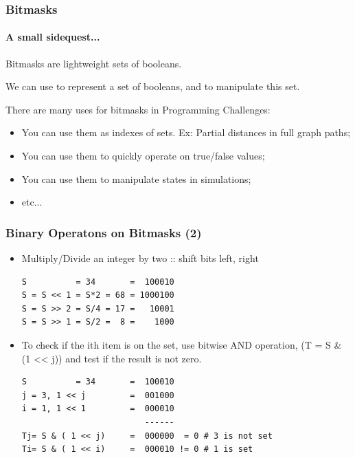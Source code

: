 \documentclass{beamer}
\begin{document}

\begin{frame}
  \frametitle{Bitmasks}
  \framesubtitle{A small sidequest...}

  Bitmasks are lightweight sets of booleans.

  \bigskip

  We can use  to represent a set
  of booleans, and  to manipulate this set.

  \bigskip

  There are many uses for bitmasks in Programming Challenges:
  
  \begin{itemize}
  \item You can use them as indexes of sets. Ex: Partial distances in full graph
    paths;
  \item You can use them to quickly operate on true/false values;
  \item You can use them to manipulate states in simulations;
  \item etc...
  \end{itemize}
\end{frame}

\begin{frame}[fragile]
  \frametitle{Binary Operatons on Bitmasks (2)}
{\smaller

  \begin{itemize}
  \item Multiply/Divide an integer by two :: shift bits left, right
\begin{verbatim}
S          = 34       =  100010
S = S << 1 = S*2 = 68 = 1000100
S = S >> 2 = S/4 = 17 =   10001
S = S >> 1 = S/2 =  8 =    1000
\end{verbatim}
\item To check if the ith item is on the set, use bitwise AND
  operation, (T = S \& (1 << j)) and test if the result is not zero.
\begin{verbatim}
S          = 34       =  100010
j = 3, 1 << j         =  001000
i = 1, 1 << 1         =  000010
                         ------
Tj= S & ( 1 << j)     =  000000  = 0 # 3 is not set
Ti= S & ( 1 << i)     =  000010 != 0 # 1 is set
\end{verbatim}

  \end{itemize}

}
\end{frame}
\end{document}
